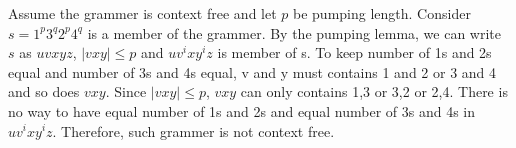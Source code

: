 \documentclass[12pt]{article}
\newenvironment{problem}[2][Problem]{\begin{trivlist}
\item[\hskip \labelsep {\bfseries #1}\hskip \labelsep {\bfseries #2.}]}{\end{trivlist}}
\begin{document}
\begin{problem}{2.32}
\end{problem}
	\hspace*{5mm} Assume the grammer is context free and let $p$ be pumping length. Consider $s=1^p3^q2^p4^q$ is a member of the grammer. By the pumping lemma, we can write $s$ as $uvxyz$, $|vxy| \leq p$ and $uv^ixy^iz$ is member of s. To keep number of 1s and 2s equal and number of 3s and 4s equal, v and y must contains 1 and 2 or 3 and 4 and so does $vxy$. Since $|vxy| \leq p$, $vxy$ can only contains 1,3 or 3,2 or 2,4. There is no way to have equal number of 1s and 2s and equal number of 3s and 4s in $uv^ixy^iz$. Therefore, such grammer is not context free. 	\\

\begin{problem}{2.47}
\end{problem}
\end{document}
